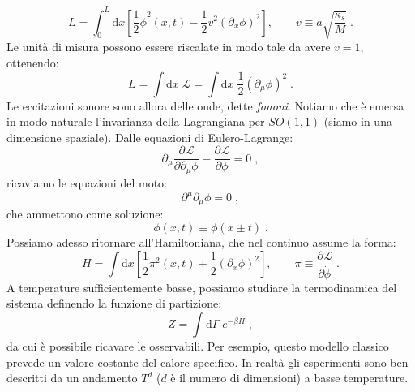 \documentclass[12pt,a4paper]{article}
\theoremstyle{definition}
\newcommand{\pdev}[3][]{\frac{\partial^{#1} #2}{\partial #3^{#1}}}
\newcommand{\lag}{\mathcal{L}}
\numberwithin{equation}{section}
\newcommand{\diff}[1][]{\mathrm{d}#1}
\begin{document}
\begin{equation}
L=\int_0^L\diff{x}\left[\frac{1}{2}\dot{\phi}^2(x,t)-\frac{1}{2}v^2(\partial_x\phi)^2\right],\qquad v\equiv a\sqrt{\frac{\kappa_s}{M}}\;.
\end{equation}
Le unità di misura possono essere riscalate in modo tale da avere $v=1$, ottenendo:
$$
L=\int\diff{x}\;\lag=\int\diff{x}\;\frac{1}{2}(\partial_{\mu}\phi)^2\;.
$$
Le eccitazioni sonore sono allora delle onde, dette \emph{fononi}. Notiamo che è emersa in modo naturale l'invarianza della Lagrangiana per $SO(1,1)$ (siamo in una dimensione spaziale). Dalle equazioni di Eulero-Lagrange:
$$
\partial_{\mu}\pdev{\lag}{\partial_{\mu}\phi}-\pdev{\lag}{\phi}=0\;,
$$
ricaviamo le equazioni del moto:
\begin{equation}
\partial^{\mu}\partial_{\mu}\phi=0\;,
\end{equation}
che ammettono come soluzione:
\begin{equation}
\phi(x,t)\equiv \phi(x\pm t)\;.
\end{equation}
Possiamo adesso ritornare all'Hamiltoniana, che nel continuo assume la forma:
\begin{equation}
H=\int\diff{x}\left[\frac{1}{2}\pi^2(x,t)+\frac{1}{2}(\partial_x\phi)^2\right],\qquad \pi\equiv\pdev{\lag}{\dot{\phi}}\;.
\end{equation}
A temperature sufficientemente basse, possiamo studiare la termodinamica del sistema definendo la funzione di partizione:
\begin{equation}
Z=\int\diff{\Gamma}\;e^{-\beta H}\;,
\end{equation}
da cui è possibile ricavare le osservabili. Per esempio, questo modello classico prevede un valore costante del calore specifico. In realtà gli esperimenti sono ben descritti da un andamento $T^d$ ($d$ è il numero di dimensioni) a basse temperature.
\end{document}
